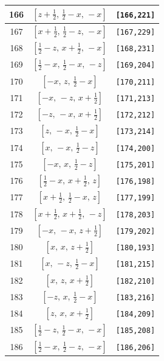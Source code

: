\documentclass[fleqn,8pt]{jsarticle}
\begin{document}
\begin{longtable}{ccc}
166 & $\left[ z + \frac{1}{2},\, \frac{1}{2} - x,\, - x \right]$ & {\tt [166,221]} \\ \hline
167 & $\left[ x + \frac{1}{2},\, \frac{1}{2} - z,\, - x \right]$ & {\tt [167,229]} \\ \hline
168 & $\left[ \frac{1}{2} - z,\, x + \frac{1}{2},\, - x \right]$ & {\tt [168,231]} \\ \hline
169 & $\left[ \frac{1}{2} - x,\, \frac{1}{2} - x,\, - z \right]$ & {\tt [169,204]} \\ \hline
170 & $\left[ - x,\, z,\, \frac{1}{2} - x \right]$ & {\tt [170,211]} \\ \hline
171 & $\left[ - x,\, - z,\, x + \frac{1}{2} \right]$ & {\tt [171,213]} \\ \hline
172 & $\left[ - z,\, - x,\, x + \frac{1}{2} \right]$ & {\tt [172,212]} \\ \hline
173 & $\left[ z,\, - x,\, \frac{1}{2} - x \right]$ & {\tt [173,214]} \\ \hline
174 & $\left[ x,\, - x,\, \frac{1}{2} - z \right]$ & {\tt [174,200]} \\ \hline
175 & $\left[ - x,\, x,\, \frac{1}{2} - z \right]$ & {\tt [175,201]} \\ \hline
176 & $\left[ \frac{1}{2} - x,\, x + \frac{1}{2},\, z \right]$ & {\tt [176,198]} \\ \hline
177 & $\left[ x + \frac{1}{2},\, \frac{1}{2} - x,\, z \right]$ & {\tt [177,199]} \\ \hline
178 & $\left[ x + \frac{1}{2},\, x + \frac{1}{2},\, - z \right]$ & {\tt [178,203]} \\ \hline
179 & $\left[ - x,\, - x,\, z + \frac{1}{2} \right]$ & {\tt [179,202]} \\ \hline
180 & $\left[ x,\, x,\, z + \frac{1}{2} \right]$ & {\tt [180,193]} \\ \hline
181 & $\left[ x,\, - z,\, \frac{1}{2} - x \right]$ & {\tt [181,215]} \\ \hline
182 & $\left[ x,\, z,\, x + \frac{1}{2} \right]$ & {\tt [182,210]} \\ \hline
183 & $\left[ - z,\, x,\, \frac{1}{2} - x \right]$ & {\tt [183,216]} \\ \hline
184 & $\left[ z,\, x,\, x + \frac{1}{2} \right]$ & {\tt [184,209]} \\ \hline
185 & $\left[ \frac{1}{2} - z,\, \frac{1}{2} - x,\, - x \right]$ & {\tt [185,208]} \\ \hline
186 & $\left[ \frac{1}{2} - x,\, \frac{1}{2} - z,\, - x \right]$ & {\tt [186,206]} \\ \hline

\end{longtable}
\end{document}
